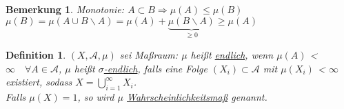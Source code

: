 \documentclass[11pt]{memoir}
\theoremstyle{changebreak}
\newtheorem{Definition}{Definition}[chapter]
\newtheorem{Bemerkung}{Bemerkung}[chapter]
\begin{document}
\begin{Bemerkung}
Monotonie: $A \subset B \Rightarrow \mu(A) \leq \mu(B)$\\
$\mu(B) = \mu(A \cup B\backslash A) = \mu(A) + \underbrace{\mu(B\backslash A)}_{\geq 0}\geq \mu(A)$
\end{Bemerkung}

\begin{Definition}
$(X, \mathscr{A}, \mu)$ sei Maßraum: $\mu$ heißt \underline{endlich}, wenn $\mu(A)$ \textless {} $ \infty \quad \forall A \in \mathscr{A}$, $\mu$ heißt \underline{$\sigma$-endlich}, falls eine Folge $(X_i) \subset \mathscr{A}$ mit $\mu(X_i)$ \textless {} $ \infty $ existiert, sodass $X = \bigcup\limits_{i=1}^{\infty} X_i$. \\
Falls $\mu(X) = 1$, so wird $\mu$ \underline{Wahrscheinlichkeitsmaß} genannt.
\end{Definition}
\end{document}
